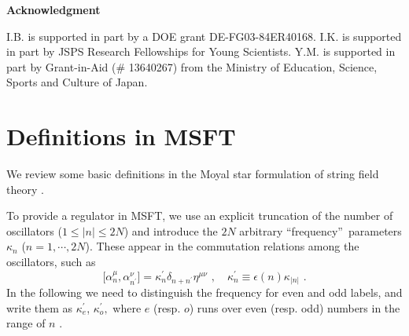 \documentclass[a4paper,aps,preprint,nofootinbib,eqsecnum]{revtex4}
\begin{document}
\begin{center}
\textbf{Acknowledgment}
\end{center}

I.B. is supported in part by a DOE grant DE-FG03-84ER40168. I.K. is
supported in part by JSPS Research Fellowships for Young Scientists. Y.M. is
supported in part by Grant-in-Aid (\# 13640267) from the Ministry of
Education, Science, Sports and Culture of Japan.

\appendix

\section{Definitions in MSFT}

We review some basic definitions in the Moyal star formulation of
string field theory \cite{B,BM1,BM2,BKM1}.


To provide a regulator in MSFT, we use an explicit truncation of the number
of oscillators ($1\leq |n|\leq 2N$) and introduce the $2N$ arbitrary
\textquotedblleft frequency\textquotedblright\ parameters $\kappa _{n}$ ($%
n=1,\cdots ,2N$). These appear in the commutation relations among the
oscillators, such as
\begin{equation}
\lbrack \alpha _{n}^{\mu },\alpha _{n^{\prime }}^{\nu }]=\kappa _{n}^{\prime
}\delta _{n+n^{\prime }}\eta ^{\mu \nu }\,\,,\quad \kappa _{n}^{\prime
}\equiv \epsilon (n)\kappa _{|n|}\,\,.  \label{osc_comm}
\end{equation}%
In the following we need to distinguish the frequency for even and odd
labels, and write them as $\kappa _{e}^{\prime }$, $\kappa _{o}^{\prime },$
where $e$ (resp. $o$) runs over even (resp. odd) numbers in the range of $n$%
.
\end{document}
